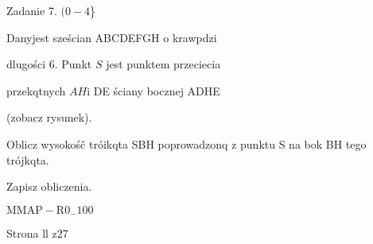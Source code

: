 \documentclass[a4paper,12pt]{article}
\begin{document}
Zadanie 7. $(0-4$\}

Danyjest sześcian ABCDEFGH o krawpdzi

dlugości 6. Punkt $S$ jest punktem przeciecia

przekqtnych $AH \mathrm{i}$ DE ściany bocznej ADHE

(zobacz rysunek).

Oblicz wysokośč tróikqta SBH poprowadzonq z punktu S na bok BH tego trójkqta.

Zapisz obliczenia.

$\mathrm{M}\mathrm{M}\mathrm{A}\mathrm{P}-\mathrm{R}0_{-}100$

Strona ll z27
\end{document}
